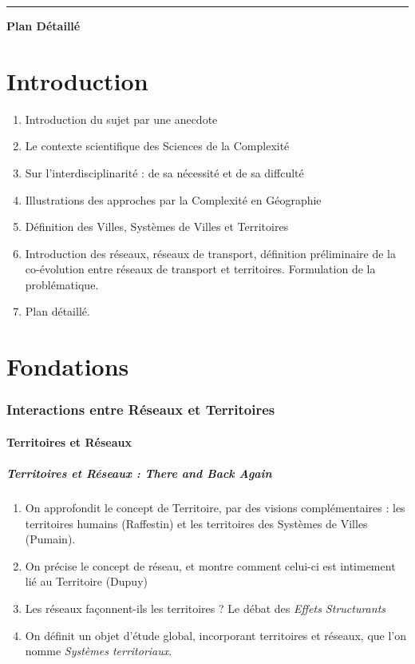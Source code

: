 \hrule

\vspace{0.5cm}

{\hfill
\Huge \textbf{Plan Détaillé}\hfill
}

\vspace{1.5cm}

\part*{Introduction}

\begin{enumerate}
	\item Introduction du sujet par une anecdote
	\item Le contexte scientifique des Sciences de la Complexité
	\item Sur l'interdisciplinarité : de sa nécessité et de sa diffculté
	\item Illustrations des approches par la Complexité en Géographie
	\item Définition des Villes, Systèmes de Villes et Territoires
	\item Introduction des réseaux, réseaux de transport, définition préliminaire de la co-évolution entre réseaux de transport et territoires. Formulation de la problématique.
	\item Plan détaillé.
\end{enumerate}



\part{Fondations}


\section{Interactions entre Réseaux et Territoires}

\subsection{Territoires et Réseaux}

\subsubsection{Territoires et Réseaux : \emph{There and Back Again}}

\begin{enumerate}
	\item On approfondit le concept de Territoire, par des visions complémentaires : les territoires humains (Raffestin) et les territoires des Systèmes de Villes (Pumain).
	\item On précise le concept de réseau, et montre comment celui-ci est intimement lié au Territoire (Dupuy)
	\item Les réseaux façonnent-ils les territoires ? Le débat des \emph{Effets Structurants}
	\item On définit un objet d'étude global, incorporant territoires et réseaux, que l'on nomme \emph{Systèmes territoriaux}.
\end{enumerate}

